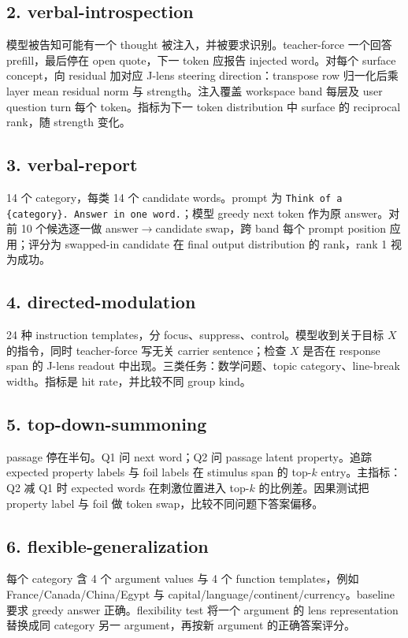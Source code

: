\documentclass[10.5pt,a4paper]{ctexart}
\begin{document}
\subsection{2. verbal-introspection}
模型被告知可能有一个 thought 被注入，并被要求识别。teacher-force 一个回答 prefill，最后停在 open quote，下一 token 应报告 injected word。对每个 surface concept，向 residual 加对应 J-lens steering direction：transpose row 归一化后乘 layer mean residual norm 与 strength。注入覆盖 workspace band 每层及 user question turn 每个 token。指标为下一 token distribution 中 surface 的 reciprocal rank，随 strength 变化。

\subsection{3. verbal-report}
14 个 category，每类 14 个 candidate words。prompt 为 \texttt{Think of a \{category\}. Answer in one word.}；模型 greedy next token 作为原 answer。对前 10 个候选逐一做 answer$\to$candidate swap，跨 band 每个 prompt position 应用；评分为 swapped-in candidate 在 final output distribution 的 rank，rank 1 视为成功。

\subsection{4. directed-modulation}
24 种 instruction templates，分 focus、suppress、control。模型收到关于目标 $X$ 的指令，同时 teacher-force 写无关 carrier sentence；检查 $X$ 是否在 response span 的 J-lens readout 中出现。三类任务：数学问题、topic category、line-break width。指标是 hit rate，并比较不同 group kind。

\subsection{5. top-down-summoning}
passage 停在半句。Q1 问 next word；Q2 问 passage latent property。追踪 expected property labels 与 foil labels 在 stimulus span 的 top-$k$ entry。主指标：Q2 减 Q1 时 expected words 在刺激位置进入 top-$k$ 的比例差。因果测试把 property label 与 foil 做 token swap，比较不同问题下答案偏移。

\subsection{6. flexible-generalization}
每个 category 含 4 个 argument values 与 4 个 function templates，例如 France/Canada/China/Egypt 与 capital/language/continent/currency。baseline 要求 greedy answer 正确。flexibility test 将一个 argument 的 lens representation 替换成同 category 另一 argument，再按新 argument 的正确答案评分。
\end{document}
